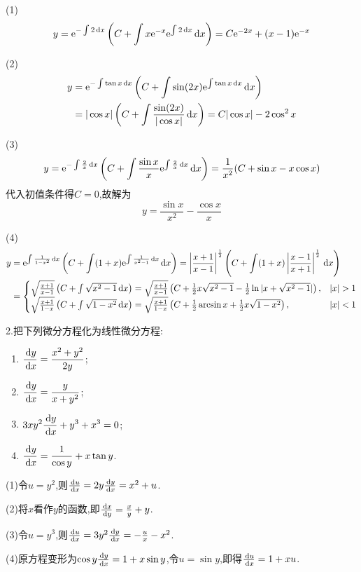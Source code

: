 \begin{solve}
(1)\[y=\mathrm{e}^{-\int2\,\mathrm{d} x}\left(C+\int x\mathrm{e}^{-x}\mathrm{e}^{\int2\,\mathrm{d} x}\,\mathrm{d} x\right)=C\mathrm{e}^{-2x}+(x-1)\mathrm{e}^{-x}\]

(2)\[\begin{split}
y&=\mathrm{e}^{-\int\tan x\,\mathrm{d} x}\left(C+\int\sin(2x)\mathrm{e}^{\int\tan x\,\mathrm{d} x}\,\mathrm{d} x\right)\\
&=|\cos x|\left(C+\int\frac{\sin(2x)}{|\cos x|}\,\mathrm{d} x\right)=C|\cos x|-2\cos^2x
\end{split}\]

(3)\[y=\mathrm{e}^{-\int\frac{2}{x}\,\mathrm{d} x}\left(C+\int\frac{\sin x}{x}\mathrm{e}^{\int\frac{2}{x}\,\mathrm{d} x}\,\mathrm{d} x\right)=\frac{1}{x^2}(C+\sin x-x\cos x)\]
代入初值条件得$C=0$,故解为
\[y=\frac{\sin x}{x^2}-\frac{\cos x}{x}\]

(4)\[
\begin{split}
y&=\e^{\int\frac{1}{1-x^2}\diff x}\left(C+\int(1+x)\e^{\int\frac{1}{x^2-1}\diff x}\diff x\right)=\left|\frac{x+1}{x-1}\right|^{\frac{1}{2}}\left(C+\int(1+x)\left|\frac{x-1}{x+1}\right|^{\frac{1}{2}}\diff x\right)\\
&=\begin{cases}
\sqrt{\frac{x+1}{x-1}}\left(C+\int\sqrt{x^2-1}\diff x\right)=\sqrt{\frac{x+1}{x-1}}\left(C+\frac{1}{2}x\sqrt{x^2-1}-\frac{1}{2}\ln|x+\sqrt{x^2-1}|\right),&|x|>1\\
\sqrt{\frac{x+1}{1-x}}\left(C+\int\sqrt{1-x^2}\diff x\right)=\sqrt{\frac{x+1}{1-x}}\left(C+\frac{1}{2}\arcsin x+\frac{1}{2}x\sqrt{1-x^2}\right),&|x|<1
\end{cases}
\end{split}\]
\end{solve}


2.把下列微分方程化为线性微分方程:
\begin{enumerate}[(1)]
\item $\displaystyle\frac{\,\mathrm{d} y}{\,\mathrm{d} x}=\frac{x^2+y^2}{2y}$;
\item $\displaystyle\frac{\,\mathrm{d} y}{\,\mathrm{d} x}=\frac{y}{x+y^2}$;
\item $\displaystyle 3xy^2\frac{\,\mathrm{d} y}{\,\mathrm{d} x}+y^3+x^3=0$;
\item $\displaystyle\frac{\,\mathrm{d} y}{\,\mathrm{d} x}=\frac{1}{\cos y}+x\tan y$.
\end{enumerate}

\begin{solve}
(1)令$u=y^2$,则$\frac{\,\mathrm{d} u}{\,\mathrm{d} x}=2y\frac{\,\mathrm{d} y}{\,\mathrm{d} x}=x^2+u$.

(2)将$x$看作$y$的函数,即$\frac{\,\mathrm{d} x}{\,\mathrm{d} y}=\frac{x}{y}+y$.

(3)令$u=y^3$,则$\frac{\,\mathrm{d} u}{\,\mathrm{d} x}=3y^2\frac{\,\mathrm{d} y}{\,\mathrm{d} x}=-\frac{u}{x}-x^2$.

(4)原方程变形为$\cos y\frac{\,\mathrm{d} y}{\,\mathrm{d} x}=1+x\sin y$,令$u=\sin y$,即得$\frac{\,\mathrm{d} u}{\,\mathrm{d} x}=1+xu$.
\end{solve}


